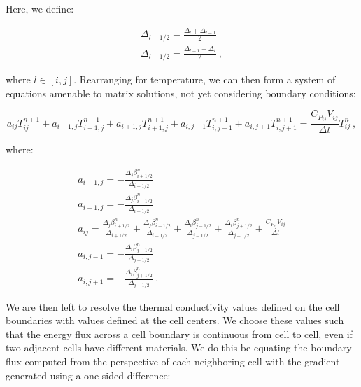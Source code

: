 \documentclass[letterpaper,12pt]{article}
\begin{document}
Here, we define:

\begin{equation}
  \begin{aligned}
    \Delta_{l-1/2} = \frac{\Delta_l + \Delta_{l-1}}{2}
    \\ \Delta_{l+1/2} = \frac{\Delta_{l+1} + \Delta_l}{2}\:,
    \label{eq:conduction_half_delta}
  \end{aligned}
\end{equation}

where $l \in [i,j]$. Rearranging for temperature, we can then form a
system of equations amenable to matrix solutions, not yet considering
boundary conditions:

\begin{equation}
 a_{ij}T^{n+1}_{ij} + a_{i-1,j}T^{n+1}_{i-1,j} +
 a_{i+1,j}T^{n+1}_{i+1,j} + a_{i,j-1}T^{n+1}_{i,j-1} +
 a_{i,j+1}T^{n+1}_{i,j+1} = \frac{C_{P_{ij}}V_{ij}}{\Delta t}
 T^n_{ij}\:,
 \label{eq:conduction_inner_terms}
\end{equation}

where:

\begin{equation}
  \begin{aligned}
    a_{i+1,j} = -\frac{\Delta_j \beta^n_{i+1/2}}{\Delta_{i+1/2}}
    \\ a_{i-1,j} = -\frac{\Delta_j \beta^n_{i-1/2}}{\Delta_{i-1/2}}
    \\ a_{ij} = \frac{\Delta_j \beta^n_{i+1/2}}{\Delta_{i+1/2}} +
    \frac{\Delta_j \beta^n_{i-1/2}}{\Delta_{i-1/2}} + \frac{\Delta_i
      \beta^n_{j-1/2}}{\Delta_{j-1/2}} + \frac{\Delta_i
      \beta^n_{j+1/2}}{\Delta_{j+1/2}} +
    \frac{C_{P_{ij}}V_{ij}}{\Delta t} \\ a_{i,j-1} = -\frac{\Delta_i
      \beta^n_{j-1/2}}{\Delta_{j-1/2}} \\ a_{i,j+1} = -\frac{\Delta_i
      \beta^n_{j+1/2}}{\Delta_{j+1/2}} \:.
    \label{eq:conduction_coeffs}
  \end{aligned}
\end{equation}

We are then left to resolve the thermal conductivity values defined on
the cell boundaries with values defined at the cell centers. We choose
these values such that the energy flux across a cell boundary is
continuous from cell to cell, even if two adjacent cells have
different materials. We do this be equating the boundary flux computed
from the perspective of each neighboring cell with the gradient
generated using a one sided difference:
\end{document}
